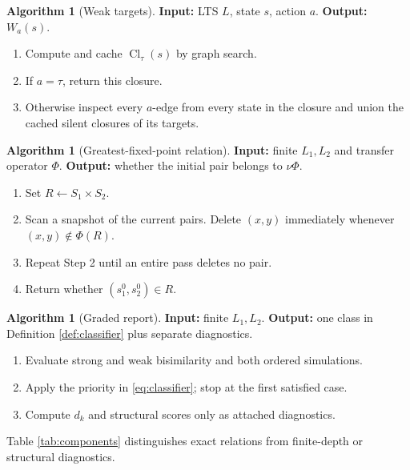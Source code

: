 \documentclass[JMCS,submit]{resources/ISRP}
\theoremstyle{definition}
\newtheorem{algorithm}[theorem]{Algorithm}
\theoremstyle{remark}
\numberwithin{equation}{section}
\newcommand{\TAU}{\tau}
\begin{document}
\begin{algorithm}[Weak targets]\label{alg:weak-targets}
\textbf{Input:} LTS $L$, state $s$, action $a$. \textbf{Output:} $W_a(s)$.
\begin{enumerate}
\item Compute and cache $\operatorname{Cl}_{\TAU}(s)$ by graph search.
\item If $a=\TAU$, return this closure.
\item Otherwise inspect every $a$-edge from every state in the closure and union
the cached silent closures of its targets.
\end{enumerate}
\end{algorithm}

\begin{algorithm}[Greatest-fixed-point relation]\label{alg:fixed-point}
\textbf{Input:} finite $L_1,L_2$ and transfer operator $\Phi$. \textbf{Output:}
whether the initial pair belongs to $\nu\Phi$.
\begin{enumerate}
\item Set $R\leftarrow S_1\times S_2$.
\item Scan a snapshot of the current pairs. Delete $(x,y)$ immediately whenever
$(x,y)\notin\Phi(R)$.
\item Repeat Step 2 until an entire pass deletes no pair.
\item Return whether $(s_1^0,s_2^0)\in R$.
\end{enumerate}
\end{algorithm}

\begin{algorithm}[Graded report]\label{alg:classifier}
\textbf{Input:} finite $L_1,L_2$. \textbf{Output:} one class in Definition
\ref{def:classifier} plus separate diagnostics.
\begin{enumerate}
\item Evaluate strong and weak bisimilarity and both ordered simulations.
\item Apply the priority in \eqref{eq:classifier}; stop at the first satisfied
case.
\item Compute $d_k$ and structural scores only as attached diagnostics.
\end{enumerate}
\end{algorithm}

Table \ref{tab:components} distinguishes exact relations from finite-depth or
structural diagnostics.
\end{document}
